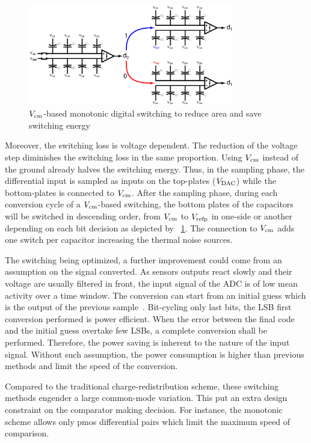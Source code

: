 \begin{figure}[htp]
	\centering
	\includegraphics[width=0.8\textwidth]{Chapter3/Figs/sar_vcm_monotonic.ps}
	\caption{\(V_{\rm cm}\)-based monotonic digital switching to reduce area and save switching energy}
	\label{fig:sar_vcm_monotonic}
\end{figure}

Moreover, the switching loss is voltage dependent. The reduction of the voltage step diminishes the switching loss in the same proportion. Using  \(V_{\rm cm}\) instead of the ground already halves the switching energy. Thus, in the sampling phase, the differential input is sampled as inputs on the top-plates (\(V_{\rm DAC}\)) while the bottom-plates is connected to \(V_{\rm cm}\). After the sampling phase, during each conversion cycle of a \(V_{\rm cm}\)-based switching, the bottom plates of the capacitors will be switched in descending order, from \(V_{\rm cm}\) to \(V_{\rm refp}\) in one-side or another depending on each bit decision as depicted by \figurename~\ref{fig:sar_vcm_monotonic}. The connection to \(V_{\rm cm}\) adds one switch per capacitor increasing the thermal noise sources.

The switching being optimized, a further improvement could come from an assumption on the signal converted. As sensors outputs react slowly and their voltage are usually filtered in front, the input signal of the ADC is of low mean activity over a time window. The conversion can start from an initial guess which is the output of the previous sample~\cite{Yaul2014}. Bit-cycling only last bits, the LSB first conversion performed is power efficient. When the error between the final code and the initial guess overtake few LSBs, a complete conversion shall be performed. Therefore, the power saving is inherent to the nature of the input signal. Without such assumption, the power consumption is higher than previous methods and limit the speed of the conversion.

Compared to the traditional charge-redistribution scheme, these switching methods engender a large common-mode variation. This put an extra design constraint on the comparator making decision. For instance, the monotonic scheme allows only pmos differential pairs which limit the maximum speed of comparison. 

